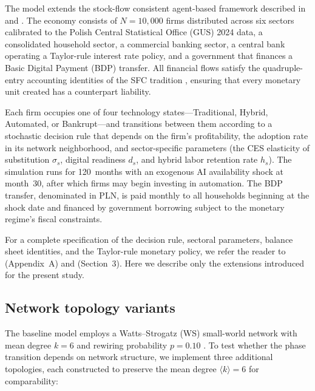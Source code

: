 \documentclass[12pt,a4paper]{article}
\begin{document}
The model extends the stock-flow consistent agent-based framework described in
\textcite{Maciaszek2026a} and \textcite{Maciaszek2026b}. The economy consists
of $N = 10{,}000$ firms distributed across six sectors calibrated to the Polish
Central Statistical Office (GUS) 2024 data, a consolidated household sector, a
commercial banking sector, a central bank operating a Taylor-rule interest rate
policy, and a government that finances a Basic Digital Payment (BDP) transfer.
All financial flows satisfy the quadruple-entry accounting identities of the
SFC tradition \parencite{Godley2007}, ensuring that every monetary unit created
has a counterpart liability.

Each firm occupies one of four technology states---Traditional, Hybrid,
Automated, or Bankrupt---and transitions between them according to a stochastic
decision rule that depends on the firm's profitability, the adoption rate in
its network neighborhood, and sector-specific parameters (the CES elasticity of
substitution $\sigma_s$, digital readiness $d_s$, and hybrid labor retention
rate $h_s$). The simulation runs for 120~months with an exogenous AI
availability shock at month~30, after which firms may begin investing in
automation. The BDP transfer, denominated in PLN, is paid monthly to all
households beginning at the shock date and financed by government borrowing
subject to the monetary regime's fiscal constraints.

For a complete specification of the decision rule, sectoral parameters, balance
sheet identities, and the Taylor-rule monetary policy, we refer the reader to
\textcite{Maciaszek2026a} (Appendix~A) and \textcite{Maciaszek2026b}
(Section~3). Here we describe only the extensions introduced for the present
study.

\subsection{Network topology variants}

The baseline model employs a Watts--Strogatz (WS) small-world network with
mean degree $k = 6$ and rewiring probability $p = 0.10$
\parencite{Watts1998}. To test whether the phase transition depends on network
structure, we implement three additional topologies, each constructed to
preserve the mean degree $\langle k \rangle = 6$ for comparability:
\end{document}
